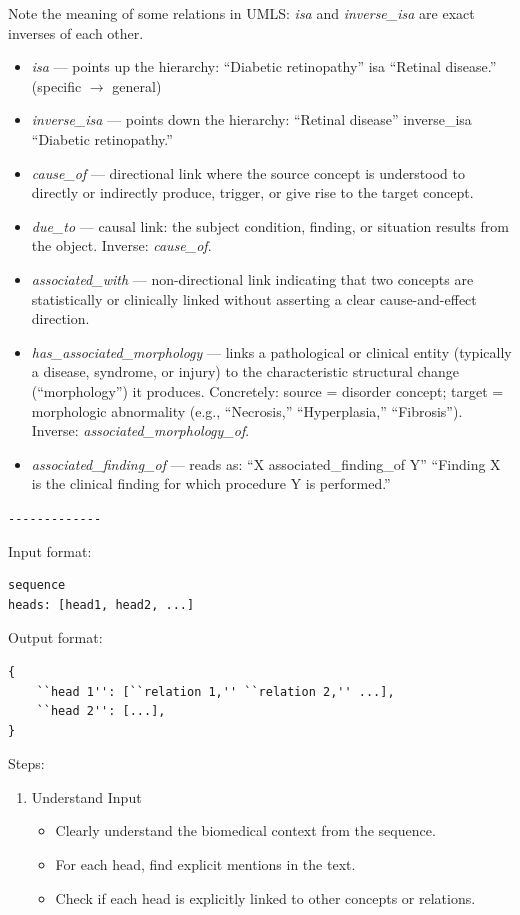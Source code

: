 \documentclass[10pt]{article}
\begin{document}
\begin{appendices}
\begin{tcolorbox}
Note the meaning of some relations in UMLS:
\emph{isa} and \emph{inverse\_isa} are exact inverses of each other.
\begin{itemize}
  \item \emph{isa} --- points up the hierarchy: ``Diabetic retinopathy'' isa ``Retinal disease.'' (specific $\rightarrow$ general)
  \item \emph{inverse\_isa} --- points down the hierarchy: ``Retinal disease'' inverse\_isa ``Diabetic retinopathy.''
  \item \emph{cause\_of} --- directional link where the source concept is understood to directly or indirectly produce, trigger, or give rise to the target concept.
  \item \emph{due\_to} --- causal link: the subject condition, finding, or situation results from the object.  
  Inverse: \emph{cause\_of}.
  \item \emph{associated\_with} --- non-directional link indicating that two concepts are statistically or clinically linked without asserting a clear cause-and-effect direction.
  \item \emph{has\_associated\_morphology} --- links a pathological or clinical entity (typically a disease, syndrome, or injury) to the characteristic structural change (``morphology'') it produces.  
  Concretely: source = disorder concept; target = morphologic abnormality (e.g., ``Necrosis,'' ``Hyperplasia,'' ``Fibrosis'').  
  Inverse: \emph{associated\_morphology\_of}.
  \item \emph{associated\_finding\_of} --- reads as:  
  \quad ``X associated\_finding\_of Y''  
  \quad ``Finding X is the clinical finding for which procedure Y is performed.''
\end{itemize}
\verb|-------------|  

\vspace{\baselineskip}

Input format:
\begin{verbatim}
sequence
heads: [head1, head2, ...]
\end{verbatim}

Output format:
\begin{verbatim}
{
    ``head 1'': [``relation 1,'' ``relation 2,'' ...],
    ``head 2'': [...],
}
\end{verbatim}

\vspace{\baselineskip}

Steps:
\begin{enumerate}
  \item Understand Input
    \begin{itemize}
      \item Clearly understand the biomedical context from the sequence.  
      \item For each head, find explicit mentions in the text.  
      \item Check if each head is explicitly linked to other concepts or relations.  
    \end{itemize}


\end{enumerate}
\end{tcolorbox}
\end{appendices}
\end{document}
